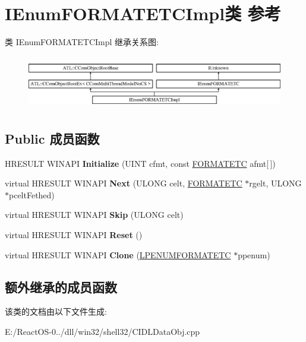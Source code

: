 \hypertarget{class_i_enum_f_o_r_m_a_t_e_t_c_impl}{}\section{I\+Enum\+F\+O\+R\+M\+A\+T\+E\+T\+C\+Impl类 参考}
\label{class_i_enum_f_o_r_m_a_t_e_t_c_impl}
类 I\+Enum\+F\+O\+R\+M\+A\+T\+E\+T\+C\+Impl 继承关系图\+:\begin{figure}[H]
\begin{center}
\leavevmode
\includegraphics[height=2.386364cm]{class_i_enum_f_o_r_m_a_t_e_t_c_impl}
\end{center}
\end{figure}
\subsection*{Public 成员函数}
\begin{DoxyCompactItemize}
\item 
\mbox{\label{class_i_enum_f_o_r_m_a_t_e_t_c_impl_a23f2400edd868d2487af9ad355c9b325}} 
H\+R\+E\+S\+U\+LT W\+I\+N\+A\+PI {\bfseries Initialize} (U\+I\+NT cfmt, const \hyperlink{struct_i_enum_f_o_r_m_a_t_e_t_c_1_1tag_f_o_r_m_a_t_e_t_c}{F\+O\+R\+M\+A\+T\+E\+TC} afmt\mbox{[}$\,$\mbox{]})
\item 
\mbox{\label{class_i_enum_f_o_r_m_a_t_e_t_c_impl_a19853c3a2ab8213250189d1f5af77fdc}} 
virtual H\+R\+E\+S\+U\+LT W\+I\+N\+A\+PI {\bfseries Next} (U\+L\+O\+NG celt, \hyperlink{struct_i_enum_f_o_r_m_a_t_e_t_c_1_1tag_f_o_r_m_a_t_e_t_c}{F\+O\+R\+M\+A\+T\+E\+TC} $\ast$rgelt, U\+L\+O\+NG $\ast$pcelt\+Fethed)
\item 
\mbox{\label{class_i_enum_f_o_r_m_a_t_e_t_c_impl_a75dde263b1793871071c21974f87b973}} 
virtual H\+R\+E\+S\+U\+LT W\+I\+N\+A\+PI {\bfseries Skip} (U\+L\+O\+NG celt)
\item 
\mbox{\label{class_i_enum_f_o_r_m_a_t_e_t_c_impl_a9fab7cd2418ed1190cf7e8b0a03110bd}} 
virtual H\+R\+E\+S\+U\+LT W\+I\+N\+A\+PI {\bfseries Reset} ()
\item 
\mbox{\label{class_i_enum_f_o_r_m_a_t_e_t_c_impl_afabe3a874b38468eb5f9630b435ca1e7}} 
virtual H\+R\+E\+S\+U\+LT W\+I\+N\+A\+PI {\bfseries Clone} (\hyperlink{interface_i_enum_f_o_r_m_a_t_e_t_c}{L\+P\+E\+N\+U\+M\+F\+O\+R\+M\+A\+T\+E\+TC} $\ast$ppenum)
\end{DoxyCompactItemize}
\subsection*{额外继承的成员函数}


该类的文档由以下文件生成\+:\begin{DoxyCompactItemize}
\item 
E\+:/\+React\+O\+S-\/0../dll/win32/shell32/C\+I\+D\+L\+Data\+Obj.\+cpp\end{DoxyCompactItemize}
